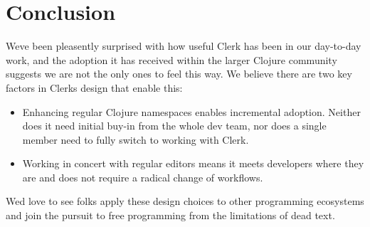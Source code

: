 \documentclass[sigconf,screen]{acmart}
\providecommand{\tightlist}{%
  \setlength{\itemsep}{0pt}\setlength{\parskip}{0pt}}
\begin{document}
\hypertarget{conclusion}{%
\section{Conclusion}\label{conclusion}}

We\textquotesingle ve been pleasently surprised with how useful Clerk has been in our day-to-day work, and the adoption it has received within the larger Clojure community suggests we are not the only ones to feel this way. We believe there are two key factors in Clerk\textquotesingle s design that enable this:

\begin{itemize}
\tightlist
\item
  Enhancing regular Clojure namespaces enables incremental adoption. Neither does it need initial buy-in from the whole dev team, nor does a single member need to fully switch to working with Clerk.
\item
  Working in concert with regular editors means it meets developers where they are and does not require a radical change of workflows.
\end{itemize}

We\textquotesingle d love to see folks apply these design choices to other programming ecosystems and join the pursuit to free programming from the limitations of dead text.
\end{document}
